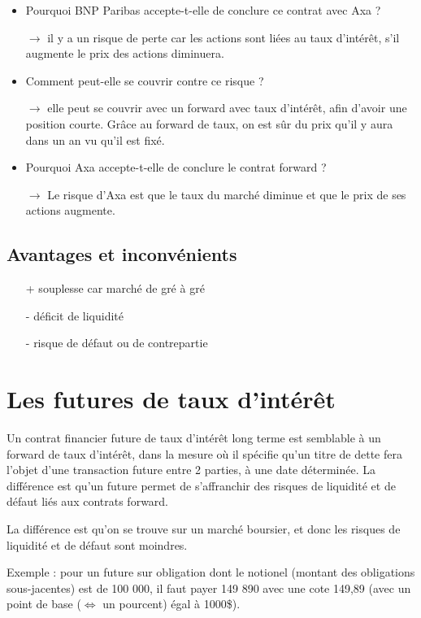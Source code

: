 \begin{itemize}
	\item Pourquoi BNP Paribas accepte-t-elle de conclure ce contrat avec Axa ? 
	\item[$\rightarrow$] il y a un risque de perte car les actions sont liées au taux d'intérêt, s'il augmente le prix des actions diminuera.
	\item Comment peut-elle se couvrir contre ce risque ?
	\item[$\rightarrow$] elle peut se couvrir avec un forward avec taux d'intérêt, afin d'avoir une position courte. Grâce au forward de taux, on est sûr du prix qu'il y aura dans un an vu qu'il est fixé.
	\item Pourquoi Axa accepte-t-elle de conclure le contrat forward ?
	\item[$\rightarrow$] Le risque d'Axa est que le taux du marché diminue et que le prix de ses actions augmente.
\end{itemize}


	\subsection{Avantages et inconvénients}
	
	\begin{itemize}
		\item[+] souplesse car marché de gré à gré
		\item[-] déficit de liquidité
		\item[-] risque de défaut ou de contrepartie 
	\end{itemize}
	
\section{Les futures de taux d'intérêt}

Un contrat financier future de taux d'intérêt long terme est semblable à un forward de taux d'intérêt, dans la mesure où il spécifie qu'un titre de dette fera l'objet d'une transaction future entre 2 parties, à une date déterminée. La différence est qu'un future permet de s'affranchir des risques de liquidité et de défaut liés aux contrats forward.

La différence est qu'on se trouve sur un marché boursier, et donc les risques de liquidité et de défaut sont moindres.

Exemple : pour un future sur obligation dont le notionel (montant des obligations sous-jacentes) est de 100 000, il faut payer 149 890 avec une cote 149,89 (avec un point de base ($\Leftrightarrow$ un pourcent) égal à 1000\$).

